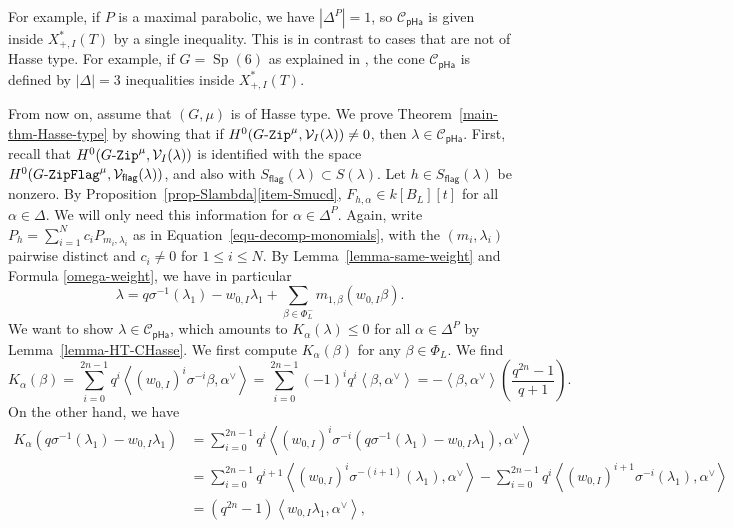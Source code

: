 \documentclass[11pt]{amsart}
\numberwithin{equation}{section}
\theoremstyle{definition}
\theoremstyle{remark}
\newcommand{\GZip}{\mathop{\text{$G$-{\tt Zip}}}\nolimits}
\newcommand{\pha}{\mathsf{pHa}}
\newcommand{\flag}{\mathsf{flag}}
\newcommand{\GF}{\mathop{\text{$G$-{\tt ZipFlag}}}\nolimits}
\newcommand{\Ccal}{{\mathcal C}}
\newcommand{\Vcal}{{\mathcal V}}
\DeclareMathOperator{\Sp}{Sp}
\begin{document}
For example, if $P$ is a maximal parabolic, we have $|\Delta^P|=1$, so $\Ccal_{\pha}$ is given inside $X_{+,I}^*(T)$ by a single inequality. This is in contrast to cases that are not of Hasse type. For example, if $G=\Sp(6)$ as explained in \cite[Section~5.5]{Koskivirta-automforms-GZip}, the cone $\Ccal_{\pha}$ is defined by $|\Delta|=3$ inequalities inside $X_{+,I}^*(T)$.

From now on, assume that $(G,\mu)$ is of Hasse type. We prove Theorem~\ref{main-thm-Hasse-type} by showing that if $H^0(\GZip^\mu,\Vcal_I(\lambda))\neq 0$, then $\lambda\in \Ccal_{\pha}$. First, recall that $H^0(\GZip^\mu,\Vcal_I(\lambda))$ is identified with the space $H^0(\GF^\mu,\Vcal_{\flag}(\lambda))$, and also with $S_{\flag}(\lambda)\subset S(\lambda)$. Let $h\in S_{\flag}(\lambda)$ be nonzero. By Proposition~\ref{prop-Slambda}\eqref{item-Smucd}, $F_{h,\alpha}\in k[B_L][t]$ for all $\alpha\in \Delta$. We will only need this information for $\alpha\in \Delta^P$. Again, write  $P_h=\sum_{i=1}^N c_{i} P_{m_i,\lambda_i}$ as in Equation~\eqref{equ-decomp-monomials}, with the $(m_i,\lambda_i)$ pairwise distinct and $c_i\neq 0$ for $1\leq i \leq N$. By Lemma~\ref{lemma-same-weight} and Formula \eqref{omega-weight}, we have in particular
\begin{equation}\label{equ-lambda1}
\lambda= q \sigma^{-1}(\lambda_1)- w_{0,I}\lambda_1 +\sum_{\beta\in \Phi^{-}_{L}} m_{1,\beta} (w_{0,I}\beta).
\end{equation}
We want to show $\lambda\in \Ccal_{\pha}$, which amounts to $K_\alpha(\lambda)\leq 0$ for all $\alpha\in \Delta^P$ by Lemma~\ref{lemma-HT-CHasse}. We first compute $K_\alpha(\beta)$ for any $\beta\in \Phi_L$. We find 
\begin{equation}
K_{\alpha}(\beta)=\sum_{i=0}^{2n-1} q^i \left\langle (w_{0,I})^i \sigma^{-i} \beta,\alpha^\vee \right\rangle = \sum_{i=0}^{2n-1} (-1)^i q^i \left\langle \beta,\alpha^\vee \right\rangle =-\left\langle\beta,\alpha^\vee \right\rangle \left(\frac{q^{2n}-1}{q+1} \right).
\end{equation}
On the other hand, we have
\begin{align}
K_\alpha\left(q \sigma^{-1}(\lambda_1)-w_{0,I}\lambda_1\right)&=\sum_{i=0}^{2n-1} q^i \left\langle (w_{0,I})^i \sigma^{-i} \left( q \sigma^{-1}(\lambda_1)-w_{0,I}\lambda_1 \right),\alpha^\vee \right\rangle \\
&=\sum_{i=0}^{2n-1} q^{i+1} \left\langle (w_{0,I})^i \sigma^{-(i+1)} (\lambda_1),\alpha^\vee \right\rangle - \sum_{i=0}^{2n-1} q^i \left\langle (w_{0,I})^{i+1} \sigma^{-i} (\lambda_1 ),\alpha^\vee \right\rangle\\
&=(q^{2n}-1) \left\langle w_{0,I} \lambda_1,\alpha^\vee \right\rangle,
\end{align}
\end{document}
